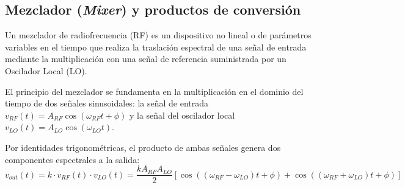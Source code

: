 \documentclass[11pt,a4paper,twoside]{report}
\begin{document}
	\subsection{Mezclador (\textit{Mixer}) y productos de conversión}
	Un mezclador de radiofrecuencia (RF) es un dispositivo no lineal o de parámetros variables en el tiempo que realiza la traslación espectral de una señal de entrada mediante la multiplicación con una señal de referencia suministrada por un Oscilador Local (LO).
	
	El principio del mezclador se fundamenta en la multiplicación en el dominio del tiempo de dos señales sinusoidales: la señal de entrada $v_{RF}(t) = A_{RF} \cos(\omega_{RF} t + \phi)$ y la señal del oscilador local $v_{LO}(t) = A_{LO} \cos(\omega_{LO} t)$.
	
	Por identidades trigonométricas, el producto de ambas señales genera dos componentes espectrales a la salida:
	\begin{equation}
		v_{out}(t) = k \cdot v_{RF}(t) \cdot v_{LO}(t) = \frac{k A_{RF} A_{LO}}{2} \left[ \cos((\omega_{RF} - \omega_{LO})t + \phi) + \cos((\omega_{RF} + \omega_{LO})t + \phi) \right]
	\end{equation}
	
\end{document}
